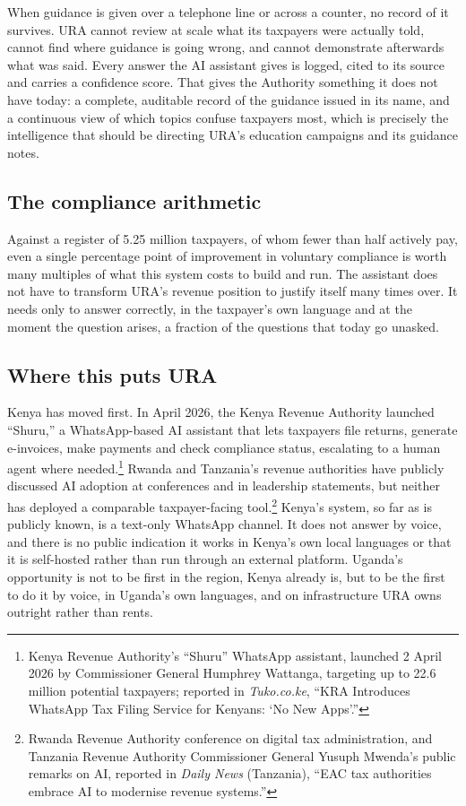 \documentclass[11pt,a4paper]{article}
\begin{document}
When guidance is given over a telephone line or across a counter, no record of it survives. URA cannot review at scale what its taxpayers were actually told, cannot find where guidance is going wrong, and cannot demonstrate afterwards what was said. Every answer the AI assistant gives is logged, cited to its source and carries a confidence score. That gives the Authority something it does not have today: a complete, auditable record of the guidance issued in its name, and a continuous view of which topics confuse taxpayers most, which is precisely the intelligence that should be directing URA's education campaigns and its guidance notes.

\subsection*{The compliance arithmetic}

Against a register of 5.25 million taxpayers, of whom fewer than half actively pay, even a single percentage point of improvement in voluntary compliance is worth many multiples of what this system costs to build and run. The assistant does not have to transform URA's revenue position to justify itself many times over. It needs only to answer correctly, in the taxpayer's own language and at the moment the question arises, a fraction of the questions that today go unasked.

\subsection*{Where this puts URA}

Kenya has moved first. In April 2026, the Kenya Revenue Authority launched ``Shuru,'' a WhatsApp-based AI assistant that lets taxpayers file returns, generate e-invoices, make payments and check compliance status, escalating to a human agent where needed.\footnote{Kenya Revenue Authority's ``Shuru'' WhatsApp assistant, launched 2 April 2026 by Commissioner General Humphrey Wattanga, targeting up to 22.6 million potential taxpayers; reported in \textit{Tuko.co.ke}, ``KRA Introduces WhatsApp Tax Filing Service for Kenyans: `No New Apps'.''} Rwanda and Tanzania's revenue authorities have publicly discussed AI adoption at conferences and in leadership statements, but neither has deployed a comparable taxpayer-facing tool.\footnote{Rwanda Revenue Authority conference on digital tax administration, and Tanzania Revenue Authority Commissioner General Yusuph Mwenda's public remarks on AI, reported in \textit{Daily News} (Tanzania), ``EAC tax authorities embrace AI to modernise revenue systems.''} Kenya's system, so far as is publicly known, is a text-only WhatsApp channel. It does not answer by voice, and there is no public indication it works in Kenya's own local languages or that it is self-hosted rather than run through an external platform. Uganda's opportunity is not to be first in the region, Kenya already is, but to be the first to do it by voice, in Uganda's own languages, and on infrastructure URA owns outright rather than rents.
\end{document}
